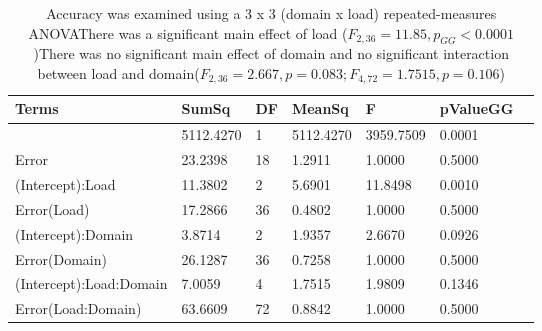 \begin{table}
\centering
\begin{tabular}[0.2em]{@{}lllllll@{}}\toprule
Terms & SumSq & DF & MeanSq & F & pValueGG\\\toprule[0.2em]
(Intercept) & 5112.4270 & 1 & 5112.4270 & 3959.7509 & 0.0001 \\\midrule
Error & 23.2398 & 18 & 1.2911 & 1.0000 & 0.5000 \\\midrule
(Intercept):Load & 11.3802 & 2 & 5.6901 & 11.8498 & 0.0010 \\\midrule
Error(Load) & 17.2866 & 36 & 0.4802 & 1.0000 & 0.5000 \\\midrule
(Intercept):Domain & 3.8714 & 2 & 1.9357 & 2.6670 & 0.0926 \\\midrule
Error(Domain) & 26.1287 & 36 & 0.7258 & 1.0000 & 0.5000 \\\midrule
(Intercept):Load:Domain & 7.0059 & 4 & 1.7515 & 1.9809 & 0.1346 \\\midrule
Error(Load:Domain) & 63.6609 & 72 & 0.8842 & 1.0000 & 0.5000 \\\bottomrule[0.2em]
\end{tabular}
\caption{Accuracy was examined using a 3 x 3 (domain x load) repeated-measures ANOVAThere was a significant main effect of load ($F_{2,36}=11.85, p_{GG}<0.0001$)There was no significant main effect of domain and no significant interaction between load and domain($F_{2,36}=2.667, p=0.083;F_{4,72}=1.7515, p=0.106$)\label{tabel:behStudy1Acc}}
\end{table}
